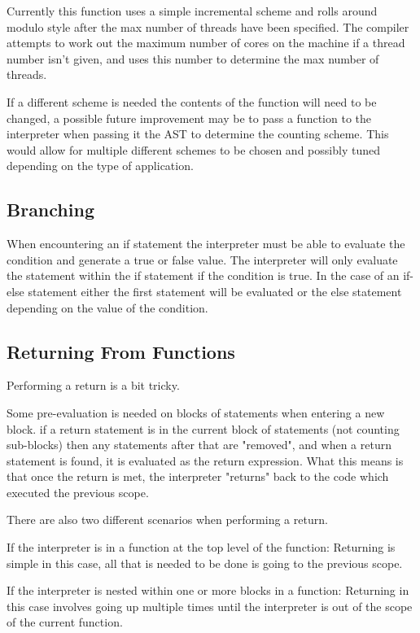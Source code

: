 Currently this function uses a simple incremental scheme and rolls around
modulo style after the max number of threads have been specified. The compiler
attempts to work out the maximum number of cores on the machine if a thread
number isn't given, and uses this number to determine the max number of threads.

If a different scheme is needed the contents of the function will need to be changed,
a possible future improvement may be to pass a function to the interpreter when passing
it the AST to determine the counting scheme. This would allow for multiple different schemes
to be chosen and possibly tuned depending on the type of application.


\subsection{Branching}
When encountering an if statement the interpreter must be able to evaluate the condition and generate a
true or false value. The interpreter will only evaluate the statement within the if statement
if the condition is true. In the case of an if-else statement either the first statement will
be evaluated or the else statement depending on the value of the condition.


\subsection{Returning From Functions}
Performing a return is a bit tricky. 

Some pre-evaluation is needed  on blocks of statements when entering a 
new block. if a return statement is
in the current block of statements (not counting sub-blocks) then
any statements after that are "removed", and when a return statement
is found, it is evaluated as the return expression.
What this means is that once the return is met, the interpreter
"returns" back to the code which executed the previous scope.

There are also two different scenarios when performing a return.

If the interpreter is in a function at the top level of the function:
Returning is simple in this case, all that is needed to be done is
going to the previous scope.

If the interpreter is nested within one or more blocks in a function:
Returning in this case involves going up multiple times until the interpreter
is out of the scope of the current function.

